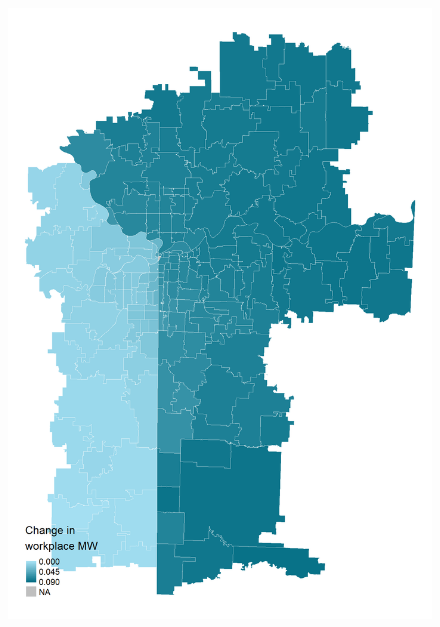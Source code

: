 \documentclass[aspectratio=169, t]{beamer}
\begin{document}
\begin{frame}[label = kc_example]
\begin{columns}
\begin{column}{0.50\textwidth}
\begin{figure}
                \includegraphics[scale = 0.36]{maps_events/output/kc2018-12_wkp_mw.png}
            \end{figure}   
        \end{column}
    \end{columns}
     \hyperlink{chi_example}{}
\end{frame}
\end{document}
